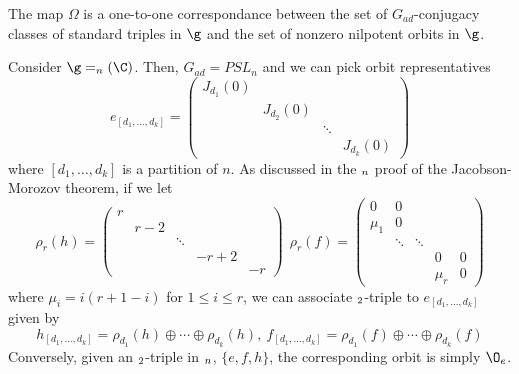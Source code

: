 \documentclass[springer-theory-notes.tex]{subfiles}
\begin{document}
\begin{thm}
  The map \(\Omega\) is a one-to-one correspondance between the set
  of \(G_{ad}\)-conjugacy classes of standard triples in \(\g\)
  and the set of nonzero nilpotent orbits in \(\g\).
\end{thm}
\begin{example}
  Consider \(\g = \sl_n(\C)\). Then, \(G_{ad} = PSL_n\) and we can
  pick orbit representatives \[
    e_{[d_1, \ldots, d_k]} = \left(
      \begin{array}{cccc}
        J_{d_1}(0)&&& \\
                  &J_{d_2}(0)&& \\
                  &&\ddots& \\
        &&&J_{d_k}(0)
      \end{array}
\right)
\]
  where \([d_1, \ldots, d_k]\) is a partition of \(n\). As discussed
  in the \(\sl_n\) proof of the Jacobson-Morozov theorem, if we
  let \[
    \rho_r(h) = \left(
      \begin{array}{ccccc}
        r&&&&\\
         &r-2&&&\\
         &&\ddots&&\\
         &&&-r+2&\\
        &&&&-r
      \end{array}
\right) \ \ \rho_r(f) = \left(
  \begin{array}{ccccc}
    0&0&&&\\
    \mu_1&0&&&\\
     &\ddots&\ddots&& \\
     &&&0&0\\
    &&&\mu_r&0
  \end{array}
\right)
\]
  where \(\mu_i = i(r+1-i)\) for \(1 \leq i \leq r\), we can associate
  \(\sl_2\)-triple to \(e_{[d_1, \ldots, d_k]}\) given by \[
    h_{[d_1, \ldots, d_k]} = \rho_{d_1}(h) \oplus \cdots \oplus
    \rho_{d_k}(h), \ f_{[d_1, \ldots, d_k]} = \rho_{d_1}(f) \oplus
    \cdots \oplus \rho_{d_k}(f)
  \]
  Conversely, given an \(\sl_2\)-triple in \(\sl_n\), \(\{e,f,h\}\),
  the corresponding orbit is simply \(\O_e\).
\end{example}
\end{document}
